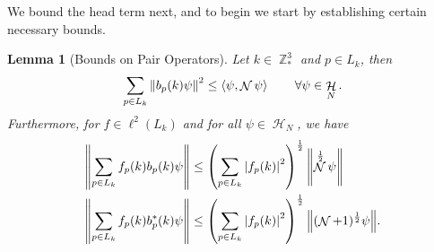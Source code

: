 \documentclass[sn-mathphys, Numbered ,a4paper]{sn-jnl}%
\DeclareMathOperator{\Z}{\mathbb{Z}}
\DeclareMathOperator{\HH}{\mathcal{H}}
\DeclareMathOperator{\NN}{\mathcal{N}}
\newcommand{\half}{\frac{1}{2}}
\newcommand{\eva}[1]{\left\langle #1 \right\rangle}
\theoremstyle{plain}
\newtheorem{lemma}[theorem]{Lemma}
\theoremstyle{definition}
\theoremstyle{remark}
\theoremstyle{plain}
\theoremstyle{definition}
\theoremstyle{remark}
\begin{document}
We bound the head term next, and to begin we start by establishing certain necessary bounds.    
\begin{lemma}[Bounds on Pair Operators]\label{lem:pairest}
    Let $k \in \Z^3_*$ and $p \in L_k$, then
    \begin{equation}\label{eq:estopb}
        \sum\limits_{p \in L_k}\norm{b_p(k)\psi}^2 \leq  \eva{\psi, \NN\psi} \quad \quad \forall \psi \in \HH_N .
    \end{equation}
    Furthermore, for $f \in \ell^2(L_k)$ and for all $\psi \in \HH_N$, we have
    \begin{align}
        \norm{\sum\limits_{p\in L_k}f_p(k)b_p(k)\psi}&\leq \left(\sum\limits_{p \in L_{k}}\left|f_p(k)\right|^2\right)^\half \norm{\NN^\half\psi}\label{eq:estb}\\
        \norm{\sum\limits_{p\in L_k}f_p(k)b^*_p(k)\psi}&\leq \left(\sum\limits_{p \in L_{k}}\left|f_p(k)\right|^2\right)^\half \norm{(\NN+1)^\half\psi}.\label{eq:estb*}
    \end{align}
\end{lemma}
\end{document}
